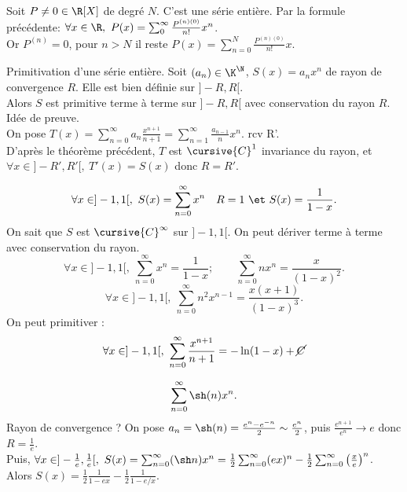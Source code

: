\documentclass[11pt]{article}
\begin{document}
\begin{ex}{}{}
    Soit $P\neq0\in\R[X]$ de degré $N$. C'est une série entière. Par la formule précédente: $\forall x \in \R, ~ P(x)=\sum_0^\infty\frac{P^{(n)(0)}}{n!}x^n$.\\
    Or $P^{(n)}=0$, pour $n>N$ il reste $P(x)=\sum_{n=0}^N\frac{P^{(n)(0)}}{n!}x$.
\end{ex}

\begin{prop}{Primitivation d'une série entière.}{}
    Soit $(a_n)\in\K^\N$, $S(x)=a_nx^n$ de rayon de convergence $R$. Elle est bien définie sur $]-R,R[$.\\
    Alors $S$ est primitive terme à terme sur $]-R,R[$ avec conservation du rayon $R$.
    \tcblower
    Idée de preuve.\\
    On pose $T(x)=\sum_{n=0}^\infty a_n\frac{x^{n+1}}{n+1}=\sum_{n=1}^\infty\frac{a_{n-1}}{n}x^n$. rcv R'.\\
    D'après le théorème précédent, $T$ est $\cursive{C}^1$  invariance du rayon, et $\forall x \in ]-R',R'[, ~ T'(x)=S(x)$ donc $R=R'$.
\end{prop}

\begin{ex}{}{}
    \begin{equation*}
        \forall x \in ]-1,1[, ~ S(x)=\sum_{n=0}^\infty x^n \quad R=1 ~\et~ S(x)=\frac{1}{1-x}.
    \end{equation*}
    On sait que $S$ est $\cursive{C}^\infty$ sur $]-1,1[$. On peut dériver terme à terme avec conservation du rayon.
    \begin{equation*}
        \forall x \in ]-1,1[, ~ \sum_{n=0}^\infty x^n=\frac{1}{1-x}; \qquad \sum_{n=0}^\infty nx^{n} = \frac{x}{(1-x)^2}.
    \end{equation*}
    \begin{equation*}
        \forall x \in ]-1,1[, ~ \sum_{n=0}^\infty n^2x^{n-1}=\frac{x(x+1)}{(1-x)^3}.
    \end{equation*}
    On peut primitiver :
    \begin{equation*}
        \forall x \in ]-1,1[, ~ \sum_{n=0}^\infty\frac{x^{n+1}}{n+1}=-\ln(1-x)+\cancel{C}
    \end{equation*}
\end{ex}

\vspace*{-0.8cm}

\begin{ex}{}{}
    \begin{equation*}
        \sum_{n=0}^\infty \sh(n)x^n.
    \end{equation*}
    Rayon de convergence ?
    \tcblower
    On pose $a_n = \sh(n)=\frac{e^{n}-e^{-n}}{2}\sim \frac{e^n}{2}$, puis $\frac{e^{n+1}}{e^n}\to e$ donc $R=\frac{1}{e}$.\\
    Puis, $\forall x \in ]-\frac{1}{e},\frac{1}{e}[, ~ S(x)=\sum_{n=0}^\infty(\sh n)x^n=\frac{1}{2}\sum_{n=0}^\infty (ex)^n - \frac{1}{2}\sum_{n=0}^\infty\left( \frac{x}{e} \right)^n$.\\
    Alors $S(x)=\frac{1}{2}\frac{1}{1-ex}-\frac{1}{2}\frac{1}{1-e/x}$.
\end{ex}
\end{document}
